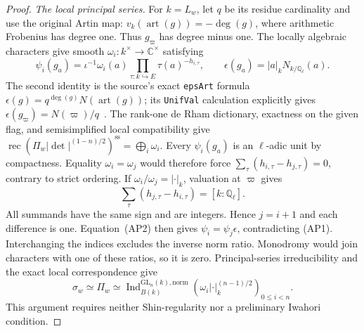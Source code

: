 \begin{proof}
\emph{The local principal series.}
For \(k=L_w\), let \(q\) be its residue cardinality and use the original
Artin map: \(v_k(\operatorname{art}(g))=-\deg(g)\), where
arithmetic Frobenius has degree one.  Thus \(g_\varpi\) has degree
minus one.
The locally algebraic characters give smooth \(\omega_i:k^\times\to
\mathbb C^\times\) satisfying
\[
 \psi_i(g_a)=\iota^{-1}\omega_i(a)
       \prod_{\tau:k\hookrightarrow E}\tau(a)^{-h_{i,\tau}},
 \qquad
 \epsilon(g_a)=|a|_kN_{k/\mathbb Q_\ell}(a).             \tag{AP2}
\]
The second identity is the source's exact \texttt{epsArt} formula
\(\epsilon(g)=q^{\deg(g)}N(\operatorname{art}(g))\); its
\texttt{UnifVal} calculation explicitly gives
\(\epsilon(g_\varpi)=N(\varpi)/q\)~\cite{SelmerPTSource}.
The rank-one de Rham dictionary, exactness on the given flag, and
semisimplified local compatibility \cite[Theorem~1.1]{SelmerPTBLGGTLocal}
give
\(\operatorname{rec}(\Pi_w|\det|^{(1-n)/2})^{\mathrm{ss}}
=\bigoplus_i\omega_i\).
Every \(\psi_i(g_a)\) is an \(\ell\)-adic unit by compactness.
Equality \(\omega_i=\omega_j\) would therefore force
\(\sum_\tau(h_{i,\tau}-h_{j,\tau})=0\), contrary to strict ordering.
If \(\omega_i/\omega_j=|\cdot|_k\), valuation at \(\varpi\) gives
\[
 \sum_\tau(h_{j,\tau}-h_{i,\tau})=[k:\mathbb Q_\ell].    \tag{AP3}
\]
All summands have the same sign and are integers.  Hence \(j=i+1\)
and each difference is one.  Equation~\textup{(AP2)} then gives
\(\psi_i=\psi_j\epsilon\), contradicting \textup{(AP1)}.
Interchanging the indices excludes the inverse norm ratio.
Monodromy would join characters with one of these ratios, so it is
zero.  Principal-series irreducibility \cite[Theorem~4.2]{SelmerPTBZ}
and the exact local correspondence give
\[
 \sigma_w\simeq\Pi_w\simeq
 \operatorname{Ind}_{B(k)}^{\mathrm{GL}_n(k),\mathrm{norm}}
       (\omega_i|\cdot|_k^{(n-1)/2})_{0\leq i<n}.        \tag{AP4}
\]
This argument requires neither Shin-regularity nor a preliminary
Iwahori condition.


\end{proof}
